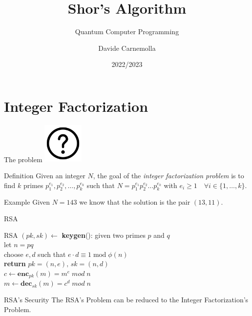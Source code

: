 \documentclass{beamer}
\title{Shor's Algorithm}
\subtitle{Quantum Computer Programming}
\author{Davide Carnemolla}
\institute{Department of Mathematics and \\ Computer Science \\ \\ University of Catania}
\date{2022/2023}
\begin{document}
    \begin{frame}
        \maketitle
    \end{frame}
    
    \section{Integer Factorization}

    \begin{frame}{The problem}
        \centering
        \includegraphics[height=2cm,keepaspectratio]{images/problem.pdf}
        \vspace{0.5cm}
        \begin{block}{Definition}
            Given an integer $N$, the goal of the \textit{integer factorization problem} is to find $k$ primes $p_1^{e_1},p_2^{e_2},\dots,p_k^{e_k}$ such that $N = p_1^{e_1}p_2^{e_2} \dots p_k^{e_k}$ with $e_i \geq 1 \quad \forall i \in \{1, \dots, k\}$.
        \end{block}
        \begin{exampleblock}{Example}
            Given $N = 143$ we know that the solution is the pair $(13, 11).$
        \end{exampleblock}
        
    \end{frame}

    \begin{frame}{RSA}
        \centering
        \begin{block}{RSA}
            $(pk,sk) \leftarrow$ \textbf{keygen}(): \hspace{0.05cm} given two primes $p$ and $q$ \\ 
                \hspace{3.7cm} let $n = pq$ \\ 
                \hspace{3.7cm} choose $e,d$ such that $e \cdot d \equiv 1 \; \text{mod} \; \phi(n)$ \\
                \hspace{3.7cm} \textbf{return} $pk = (n,e), \, sk = (n, d)$ \\
            \vspace{0.5cm}
            $c \leftarrow \textbf{enc}_{pk}(m) = m^e \; mod \; n$ \\
            \vspace{0.5cm}
            $m \leftarrow \textbf{dec}_{sk}(m) = c^d \; mod \; n$
        \end{block}
        \begin{alertblock}{RSA's Security}
            The RSA's Problem can be reduced to the Integer Factorization's Problem.
        \end{alertblock}
    \end{frame}
\end{document}
